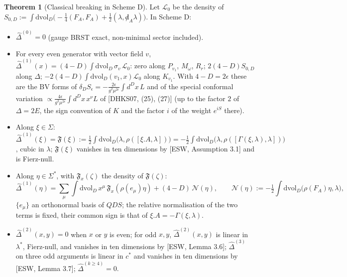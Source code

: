 \documentclass[11pt]{article}
\theoremstyle{definition}
\newtheorem{theorem}[definition]{Theorem}
\numberwithin{equation}{section}
\begin{document}
\begin{theorem}[Classical breaking in Scheme D]
\label{thm:breakD}
Let $\mathscr L_0$ be the density of $S_{0,D}:=\int\mathrm{dvol}_D\big(-\frac14(F_A,F_A)+\frac12(\lambda,{\not d}_A\lambda)\big)$. In Scheme D:
\begin{itemize}
\item[(i)] $\widehat\Delta^{(0)}=0$ (gauge BRST exact, non-minimal sector included).
\item[(ii)] For every even generator with vector field $v$, $\widehat\Delta^{(1)}(x)=(4-D)\int\mathrm{dvol}_D\,\sigma_v\,\mathscr L_0$: zero along $P_{v_1}$, $M_\omega$, $R_r$; $2(4-D)S_{0,D}$ along $\Delta$; $-2(4-D)\int\mathrm{dvol}_D(v_1,x)\mathscr L_0$ along $K_{v_1}$. With $4-D=2\epsilon$ these are the BV forms of $\delta_DS_\epsilon=-\frac{2\epsilon}{g^2\mu^{2\epsilon}}\int d^Dx\,L$ and of the special conformal variation $\propto\frac{4\epsilon}{g^2\mu^{2\epsilon}}\int d^Dx\,x^\nu L$ of [DHKS07, (25), (27)] (up to the factor $2$ of $\Delta=2E$, the sign convention of $K$ and the factor $i$ of the weight $e^{iS}$ there).
\item[(iii)] Along $\xi\in\Sigma$: $\widehat\Delta^{(1)}(\xi)=\mathfrak F(\xi):=\frac12\int\mathrm{dvol}_D\big(\lambda,\rho([\xi.A,\lambda])\big)=-\frac12\int\mathrm{dvol}_D\big(\lambda,\rho([\Gamma(\xi,\lambda),\lambda])\big)$, cubic in $\lambda$; $\mathfrak F(\xi)$ vanishes in ten dimensions by [ESW, Assumption 3.1] and is Fierz-null.
\item[(iv)] Along $\eta\in\Sigma^*$, with $\mathfrak F_x(\zeta)$ the density of $\mathfrak F(\zeta)$:
\[
\widehat\Delta^{(1)}(\eta)=\sum_{\mu}\int\mathrm{dvol}_D\,x^\mu\,\mathfrak F_x(\rho(e_\mu)\eta)+(4-D)\,\mathcal N(\eta),\qquad \mathcal N(\eta):=-\tfrac12\int\mathrm{dvol}_D\big(\rho(F_A)\eta,\lambda\big),
\]
$\{e_\mu\}$ an orthonormal basis of $QDS$; the relative normalisation of the two terms is fixed, their common sign is that of $\xi.A=-\Gamma(\xi,\lambda)$.
\item[(v)] $\widehat\Delta^{(2)}(x,y)=0$ when $x$ or $y$ is even; for odd $x,y$, $\widehat\Delta^{(2)}(x,y)$ is linear in $\lambda^*$, Fierz-null, and vanishes in ten dimensions by [ESW, Lemma 3.6]; $\widehat\Delta^{(3)}$ on three odd arguments is linear in $c^*$ and vanishes in ten dimensions by [ESW, Lemma 3.7]; $\widehat\Delta^{(k\ge4)}=0$.
\end{itemize}
\end{theorem}
\end{document}
